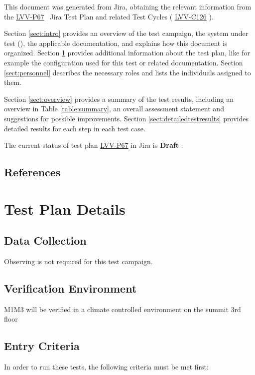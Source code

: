 \documentclass[SE,lsstdraft,STR,toc]{lsstdoc}
\begin{document}
This document was generated from Jira, obtaining the relevant information from the
\href{https://jira.lsstcorp.org/secure/Tests.jspa\#/testPlan/LVV-P67}{LVV-P67}
~Jira Test Plan and related Test Cycles (
\href{https://jira.lsstcorp.org/secure/Tests.jspa\#/testCycle/LVV-C126}{LVV-C126}
).


Section \ref{sect:intro} provides an overview of the test campaign, the system under test (\product{}),
the applicable documentation, and explains how this document is organized.
Section \ref{sect:testplan} provides additional information about the test plan, like for example the configuration
used for this test or related documentation.
Section \ref{sect:personnel} describes the necessary roles and lists the individuals assigned to them.

Section \ref{sect:overview} provides a summary of the test results, including an overview in Table \ref{table:summary},
an overall assessment statement and suggestions for possible improvements.
Section \ref{sect:detailedtestresults} provides detailed results for each step in each test case.

The current status of test plan \href{https://jira.lsstcorp.org/secure/Tests.jspa\#/testPlan/LVV-P67}{LVV-P67} in Jira is \textbf{ Draft }.

\subsection{References}
\label{sect:references}
\renewcommand{\refname}{}



\newpage
\section{Test Plan Details}
\label{sect:testplan}


\subsection{Data Collection}

  Observing is not required for this test campaign.

\subsection{Verification Environment}
\label{sect:hwconf}
  M1M3 will be verified in a climate controlled environment on the summit
3rd floor

  \subsection{Entry Criteria}
  In order to run these tests, the following criteria must be met first:\\
\end{document}
